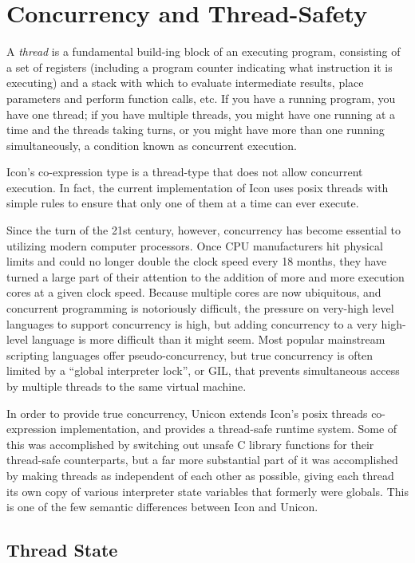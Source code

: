 \chapter{Concurrency and Thread-Safety}

A {\em thread\/} is a fundamental build-ing block of an executing
program, consisting of a set of registers (including a program counter
indicating what instruction it is executing) and a stack with which
to evaluate intermediate results, place parameters and perform
function calls, etc.  If you have a running program, you have one
thread; if you have multiple threads, you might have one running at
a time and the threads taking turns, or you might have more than one
running simultaneously, a condition known as concurrent execution.

Icon's co-expression type is a thread-type that does not allow
concurrent execution.  In fact, the current implementation of Icon
uses posix threads with simple rules to ensure that only one of them
at a time can ever execute.

Since the turn of the 21st century, however, concurrency has become
essential to utilizing modern computer processors.  Once CPU
manufacturers hit physical limits and could no longer double the
clock speed every 18 months, they have turned a large part of their
attention to the addition of more and more execution cores at a given
clock speed.  Because multiple cores are now ubiquitous, and
concurrent programming is notoriously difficult, the pressure on
very-high level languages to support concurrency is high, but
adding concurrency to a very high-level language is more difficult
than it might seem.  Most popular mainstream scripting languages
offer pseudo-concurrency, but true concurrency is often limited by
a ``global interpreter lock'', or GIL, that prevents simultaneous
access by multiple threads to the same virtual machine.

In order to provide true concurrency, Unicon extends Icon's posix
threads co-expression implementation, and provides a thread-safe
runtime system.  Some of this was accomplished by switching out unsafe
C library functions for their thread-safe counterparts, but a far more
substantial part of it was accomplished by making threads as
independent of each other as possible, giving each thread its own copy
of various interpreter state variables that formerly were
globals. This is one of the few semantic differences between Icon and
Unicon.

\section{Thread State}

